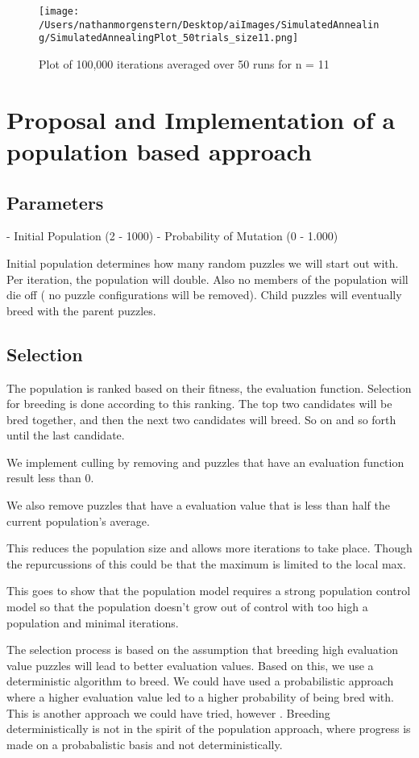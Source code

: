 \documentclass{report}
\begin{document}
	\begin{figure}[H]
	\centering
	\texttt{[image: /Users/nathanmorgenstern/Desktop/aiImages/SimulatedAnnealing/SimulatedAnnealingPlot\_50trials\_size11.png]}
	\caption{Plot of 100,000 iterations averaged over 50 runs for n = 11}
	\label{fig: Plot of 100,000 iterations averaged over 50 runs for n = 11}
	\end{figure}

\newpage
\section{Proposal and Implementation of a population based approach}
\subsection{Parameters}
	- Initial Population (2 - 1000)
	- Probability of Mutation (0 - 1.000)

Initial population determines how many random puzzles we will start out with. Per iteration, the population will double. Also no members of the population will die off ( no puzzle configurations will be removed). Child puzzles will eventually breed with the parent puzzles.


\subsection{Selection}
The population is ranked based on their fitness, the evaluation function. Selection for breeding is done according to this ranking. The top two candidates will be bred together, and then the next two candidates will breed. So on and so forth until the last candidate.

We implement culling by removing and puzzles that have an evaluation function result less than 0. 

We also remove puzzles that have a evaluation value that is less than half the current population's average.

This reduces the population size and allows more iterations to take place. Though the repurcussions of this could be that the maximum is limited to the local max.

This goes to show that the population model requires a strong population control model so that the population doesn't grow out of control with too high a population and minimal iterations.

The selection process is based on the assumption that breeding high evaluation value puzzles will lead to better evaluation values. Based on this, we use a deterministic algorithm to breed. We could have used a probabilistic approach where a higher evaluation value led to a higher probability of being bred with. This is another approach we could have tried, however . Breeding deterministically is not in the spirit of the population approach, where progress is made on a probabalistic basis and not deterministically.
\end{document}
